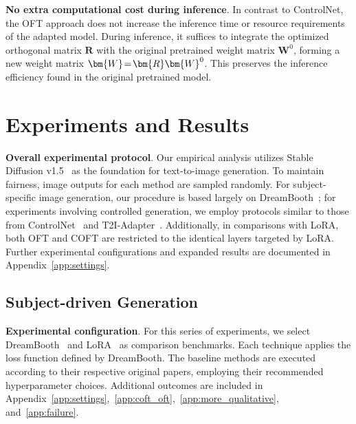 {\textbf{No extra computational cost during inference}. In contrast to ControlNet, the OFT approach does not increase the inference time or resource requirements of the adapted model. During inference, it suffices to integrate the optimized orthogonal matrix $\bm{R}$ with the original pretrained weight matrix $\bm{W}^0$, forming a new weight matrix $\thickmuskip=2mu \medmuskip=2mu \bm{W}=\bm{R}\bm{W}^0$. This preserves the inference efficiency found in the original pretrained model.

\section{Experiments and Results}

\textbf{Overall experimental protocol}. Our empirical analysis utilizes Stable Diffusion v1.5~\cite{rombach2022high} as the foundation for text-to-image generation. To maintain fairness, image outputs for each method are sampled randomly. For subject-specific image generation, our procedure is based largely on DreamBooth~\cite{ruiz2023dreambooth}; for experiments involving controlled generation, we employ protocols similar to those from ControlNet~\cite{zhang2023adding} and T2I-Adapter~\cite{mou2023t2i}. Additionally, in comparisons with LoRA, both OFT and COFT are restricted to the identical layers targeted by LoRA. Further experimental configurations and expanded results are documented in Appendix~\ref{app:settings}.

\subsection{Subject-driven Generation}

\textbf{Experimental configuration}. For this series of experiments, we select DreamBooth~\cite{ruiz2023dreambooth} and LoRA~\cite{hulora2022} as comparison benchmarks. Each technique applies the loss function defined by DreamBooth. The baseline methods are executed according to their respective original papers, employing their recommended hyperparameter choices. Additional outcomes are included in Appendix~\ref{app:settings},~\ref{app:coft_oft},~\ref{app:more_qualitative}, and~\ref{app:failure}.

}
